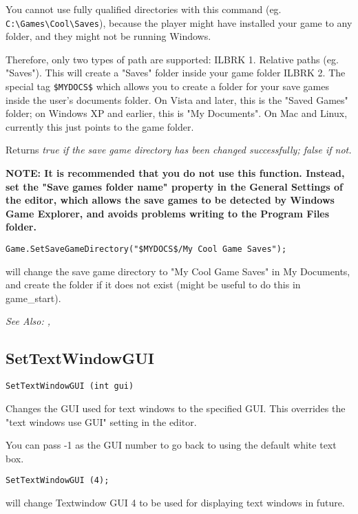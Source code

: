 You cannot use fully qualified directories with this command (eg. \verb$C:\Games\Cool\Saves$), because
the player might have installed your game to any folder, and they might not be running Windows.

Therefore, only two types of path are supported: ILBRK
1. Relative paths (eg. "Saves"). This will create a "Saves" folder inside your game folder ILBRK
2. The special tag \verb!$MYDOCS$! which allows you to create a folder for your save games
inside the user's documents folder. On Vista and later, this is the "Saved Games" folder;
on Windows XP and earlier, this is "My Documents". On Mac and Linux, currently this just points
to the game folder.

Returns \it{true} if the save game directory has been changed successfully; \it{false} if not.

\bf{NOTE:} It is recommended that you do not use this function. Instead, set the "Save games
folder name" property in the General Settings of the editor, which allows the save games to be
detected by Windows Game Explorer, and avoids problems writing to the Program Files folder.

\begin{verbatim}
Game.SetSaveGameDirectory("$MYDOCS$/My Cool Game Saves");
\end{verbatim}
will change the save game directory to "My Cool Game Saves" in My Documents, and create the
folder if it does not exist (might be useful to do this in game_start).

\it{See Also:} ,


\subsection{SetTextWindowGUI}\label{SetTextWindowGUI}%

\begin{verbatim}
SetTextWindowGUI (int gui)
\end{verbatim}
Changes the GUI used for text windows to the specified GUI. This overrides
the "text windows use GUI" setting in the editor.

You can pass -1 as the GUI number to go back to using the default white text box.

\begin{verbatim}
SetTextWindowGUI (4);
\end{verbatim}
will change Textwindow GUI 4 to be used for displaying text windows in future.


